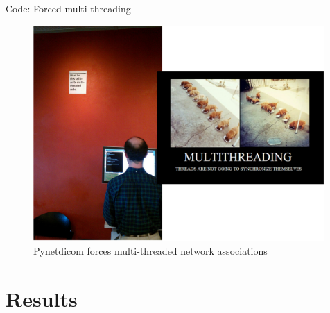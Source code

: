 \documentclass[9pt]{beamer}
\begin{document}
\begin{frame}{Code: Forced multi-threading}
  \begin{figure}
    \includegraphics[width=0.99\textwidth]{images/multi}
    \caption{Pynetdicom forces multi-threaded network associations}
  \end{figure}
\end{frame}


\section{Results}
% 
%
\end{document}
